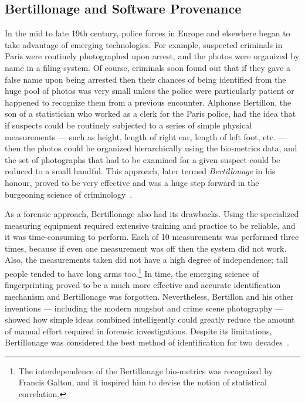 \subsection{Bertillonage and Software Provenance{\label{sec:bertillonage}}}

In the mid to late 19th century, police forces in Europe and elsewhere
began to take advantage of emerging technologies.  For example,
suspected criminals in Paris were routinely photographed upon arrest, and
the photos were organized by name in a filing system.  Of course, criminals
soon found out that if they gave a false name upon being arrested then
their chances of being identified from the huge pool of photos was very
small unless the police were particularly patient or happened to recognize
them from a previous encounter.  Alphonse Bertillon, the son of a
statistician who worked as a clerk for the Paris police, had the idea that
if suspects could be routinely subjected to a series of simple physical
measurements --- such as height, length of right ear, length of left foot,
etc. --- then the photos could be organized hierarchically using the
bio-metrics data, and the set of photographs that had to be examined for a
given suspect could be reduced to a small handful.
This approach, later termed \emph{Bertillonage} in his honour, proved to be
very effective and was a huge step forward in the burgeoning science of
criminology~\cite{encyForensic2000}.

As a forensic approach, Bertillonage also had its drawbacks.  Using the
specialized measuring equipment required extensive training and practice to
be reliable, and it was time-consuming to perform.  Each of 10 measurements
was performed three times, because if even one measurement was off then the
system did not work.  Also, the measurements taken did not have a high
degree of independence; tall people tended to have long arms
too.\footnote{The interdependence of the Bertillonage bio-metrics was
recognized by Francis Galton, and it inspired him to devise the notion of
statistical correlation.} In time, the emerging science of fingerprinting
proved to be a much more effective and accurate identification mechanism
and Bertillonage was forgotten.  Nevertheless, Bertillon and his other
inventions --- including the modern mugshot and crime scene photography ---
showed how simple ideas combined intelligently could greatly reduce the
amount of manual effort required in forensic investigations. Despite its
limitations, Bertillonage was considered the best method of identification
for two decades~\cite{forensic2006}.

